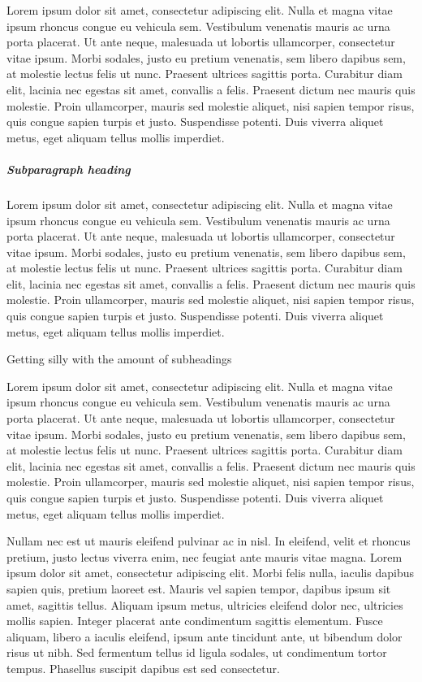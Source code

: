 \documentclass[doc,longtable]{apa6}
\begin{document}
Lorem ipsum dolor sit amet, consectetur adipiscing elit. Nulla et magna
vitae ipsum rhoncus congue eu vehicula sem. Vestibulum venenatis mauris
ac urna porta placerat. Ut ante neque, malesuada ut lobortis
ullamcorper, consectetur vitae ipsum. Morbi sodales, justo eu pretium
venenatis, sem libero dapibus sem, at molestie lectus felis ut nunc.
Praesent ultrices sagittis porta. Curabitur diam elit, lacinia nec
egestas sit amet, convallis a felis. Praesent dictum nec mauris quis
molestie. Proin ullamcorper, mauris sed molestie aliquet, nisi sapien
tempor risus, quis congue sapien turpis et justo. Suspendisse potenti.
Duis viverra aliquet metus, eget aliquam tellus mollis imperdiet.

\hypertarget{subparagraph-heading}{%
\subparagraph{Subparagraph heading}\label{subparagraph-heading}}

Lorem ipsum dolor sit amet, consectetur adipiscing elit. Nulla et magna
vitae ipsum rhoncus congue eu vehicula sem. Vestibulum venenatis mauris
ac urna porta placerat. Ut ante neque, malesuada ut lobortis
ullamcorper, consectetur vitae ipsum. Morbi sodales, justo eu pretium
venenatis, sem libero dapibus sem, at molestie lectus felis ut nunc.
Praesent ultrices sagittis porta. Curabitur diam elit, lacinia nec
egestas sit amet, convallis a felis. Praesent dictum nec mauris quis
molestie. Proin ullamcorper, mauris sed molestie aliquet, nisi sapien
tempor risus, quis congue sapien turpis et justo. Suspendisse potenti.
Duis viverra aliquet metus, eget aliquam tellus mollis imperdiet.

Getting silly with the amount of subheadings

Lorem ipsum dolor sit amet, consectetur adipiscing elit. Nulla et magna
vitae ipsum rhoncus congue eu vehicula sem. Vestibulum venenatis mauris
ac urna porta placerat. Ut ante neque, malesuada ut lobortis
ullamcorper, consectetur vitae ipsum. Morbi sodales, justo eu pretium
venenatis, sem libero dapibus sem, at molestie lectus felis ut nunc.
Praesent ultrices sagittis porta. Curabitur diam elit, lacinia nec
egestas sit amet, convallis a felis. Praesent dictum nec mauris quis
molestie. Proin ullamcorper, mauris sed molestie aliquet, nisi sapien
tempor risus, quis congue sapien turpis et justo. Suspendisse potenti.
Duis viverra aliquet metus, eget aliquam tellus mollis imperdiet.

Nullam nec est ut mauris eleifend pulvinar ac in nisl. In eleifend,
velit et rhoncus pretium, justo lectus viverra enim, nec feugiat ante
mauris vitae magna. Lorem ipsum dolor sit amet, consectetur adipiscing
elit. Morbi felis nulla, iaculis dapibus sapien quis, pretium laoreet
est. Mauris vel sapien tempor, dapibus ipsum sit amet, sagittis tellus.
Aliquam ipsum metus, ultricies eleifend dolor nec, ultricies mollis
sapien. Integer placerat ante condimentum sagittis elementum. Fusce
aliquam, libero a iaculis eleifend, ipsum ante tincidunt ante, ut
bibendum dolor risus ut nibh. Sed fermentum tellus id ligula sodales, ut
condimentum tortor tempus. Phasellus suscipit dapibus est sed
consectetur.

\newpage

\printbibliography[title=References]
\end{document}
